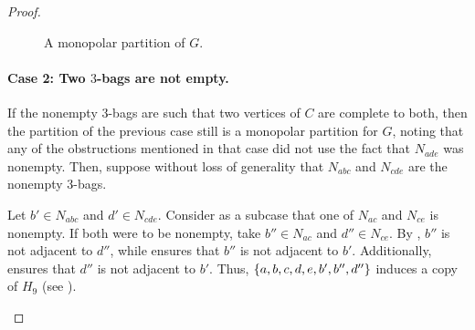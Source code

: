 \begin{proof}
\begin{figure}[htb!]
        \caption{A monopolar partition of $G$.}
        \label{fig:monopolar_partition_1}
    \end{figure}

    \paragraph{Case 2: Two $3$-bags are not empty.} If the nonempty 3-bags are
    such that two vertices of $C$ are complete to both, then the partition of
    the previous case still is a monopolar partition for $G$, noting that any of
    the obstructions mentioned in that case did not use the fact that $N_{ade}$
    was nonempty. Then, suppose without loss of generality that $N_{abc}$ and
    $N_{cde}$ are the nonempty 3-bags.

    Let $b'\in N_{abc}$ and $d'\in N_{cde}$. Consider as a subcase that one of
    $N_{ac}$ and $N_{ce}$ is nonempty. If both were to be nonempty, take $b''\in
    N_{ac}$ and $d''\in N_{ce}$. By , $b''$ is not
    adjacent to $d''$, while  ensures that $b''$ is not
    adjacent to $b'$. Additionally,  ensures that $d''$
    is not adjacent to $b'$. Thus, $\left\{a,b,c,d,e,b',b'',d''\right\}$ induces a copy of
    $H_9$ (see ).

    \begin{figure}[htb!]
        \centering
\end{figure}
\end{proof}

